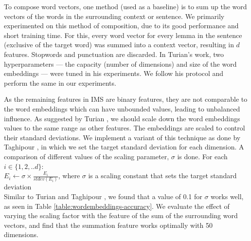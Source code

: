 To compose word vectors, one method (used as a baseline) is to sum up
the word vectors of the words in the surrounding context or
sentence. We primarily experimented on this method of composition, due
to its good performance and short training time. For this, every word
vector for every lemma in the sentence (exclusive of the target word)
was summed into a context vector, resulting in $d$ features. Stopwords
and punctuation are discarded. In Turian's
 work, two hyperparameters ---
the capacity (number of dimensions) and size of the word embeddings
--- were tuned in his experiments. We follow his protocol and perform
the same in our experiments.

As the remaining features in IMS are binary features, they are not
comparable to the word embeddings which can have unbounded values,
leading to unbalanced influence. As suggested by Turian
, we should scale down the word
embeddings values to the same range as other features. The embeddings are scaled to control their standard
deviations. We implement a variant of this technique as done by
Taghipour , in which we set the target standard
deviation for each dimension. A comparison of different values of the
scaling parameter, $\sigma$ is done. For each $i \in \{1, 2, .. d\}$:
\\

$E_{i} \leftarrow \sigma \times \frac{E_{i}}{stdev(E_{i})} $, where
$\sigma$ is a scaling constant that sets the target standard deviation
\\

Similar to Turian 
and Taghipour , we found that a value of 0.1
for $\sigma$ works well, as seen in Table
\ref{table:wordembeddings-accuracy}. 
We evaluate the effect of varying the scaling factor with the feature
of the sum of the surrounding word vectors, and find that the
summation feature works optimally with 50 dimensions.

